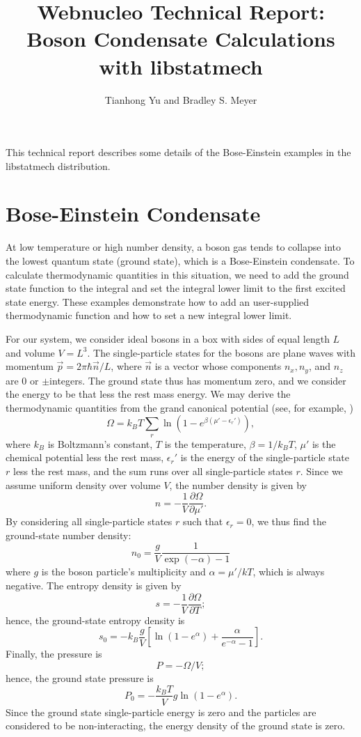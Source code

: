 \documentclass[pdftex]{article}    %
\title{Webnucleo Technical Report: Boson Condensate Calculations with libstatmech}  %
\author{Tianhong Yu and Bradley S. Meyer}
\begin{document}

\maketitle                 %


This technical report describes some details of the Bose-Einstein examples
in the libstatmech distribution.

\section{Bose-Einstein Condensate}

At low temperature or high number density, a boson gas tends to collapse into
the lowest quantum state (ground state), which is a Bose-Einstein condensate.
To calculate thermodynamic quantities in this situation, we need to add the
ground state function to the integral and set the integral lower limit to 
the first excited state energy. These examples demonstrate how to add an 
user-supplied thermodynamic function and how to set a new integral lower limit.

For our system, we consider ideal bosons in
a box with sides of equal length $L$ and volume
$V = L^3$.  The single-particle states for the bosons are plane waves with
momentum ${\vec p} = 2\pi\hbar {\vec n}/L$, where ${\vec n}$ is a vector
whose components $n_x, n_y$, and $n_z$ are 0 or $\pm$integers.  The ground
state thus has momentum zero, and we consider the energy to be that less the
rest mass energy.  We may derive the thermodynamic quantities from the grand
canonical potential (see, for example, \cite{PitaevskiiAndStringari})
\[
\Omega = k_BT\sum_r \ln\left(1 - e^{\beta(\mu' - \epsilon_r')}\right),
\]
where $k_B$ is Boltzmann's constant, $T$ is the temperature, 
$\beta = 1/k_BT$, $\mu'$ is the chemical potential less the rest mass,
$\epsilon_r'$ is the energy of the single-particle state $r$ less the rest
mass, and the sum runs over all single-particle states $r$.  Since we assume
uniform density over volume $V$, the number density is given by
\[
n = -\frac{1}{V}\frac{\partial \Omega}{\partial \mu'}.
\]
By considering
all single-particle states $r$ such that $\epsilon_r = 0$, we thus find the
ground-state number density:
\[
n_0 = \frac{g}{V} \frac{1}{{\exp}(-\alpha)-1}
\]
where $g$ is the boson particle's multiplicity
and $\alpha = \mu'/kT$, which
is always negative.  The entropy density is given by
\[
s = -\frac{1}{V}\frac{\partial \Omega}{\partial T};
\]
hence, the ground-state entropy density is
\[
s_0 = -k_B \frac{g}{V}\left[
  \ln\left( 1 - e^\alpha \right )
  + \frac{\alpha}{e^{-\alpha} - 1 }
\right].
\]
Finally, the pressure is
\[
P = -\Omega / V;
\]
hence, the ground state pressure is
\[
P_0 = -\frac{k_BT}{V} g \ln\left( 1 - e^\alpha \right ).
\]
Since the ground state single-particle energy is zero and the particles are
considered to be non-interacting, the energy density of the ground state is
zero.
\end{document}

